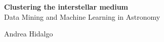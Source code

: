 \documentclass[11pt,fleqn]{book} %
\begin{document}

\begingroup
\thispagestyle{empty}
\centering
\vspace*{5cm}
\par\normalfont\fontsize{35}{35}\sffamily\selectfont
\textbf{Clustering the interstellar medium}\\
{\LARGE Data Mining and Machine Learning in Astronomy}\par %
\vspace*{1cm}
{\Huge Andrea Hidalgo}\par %
\endgroup

\end{document}
